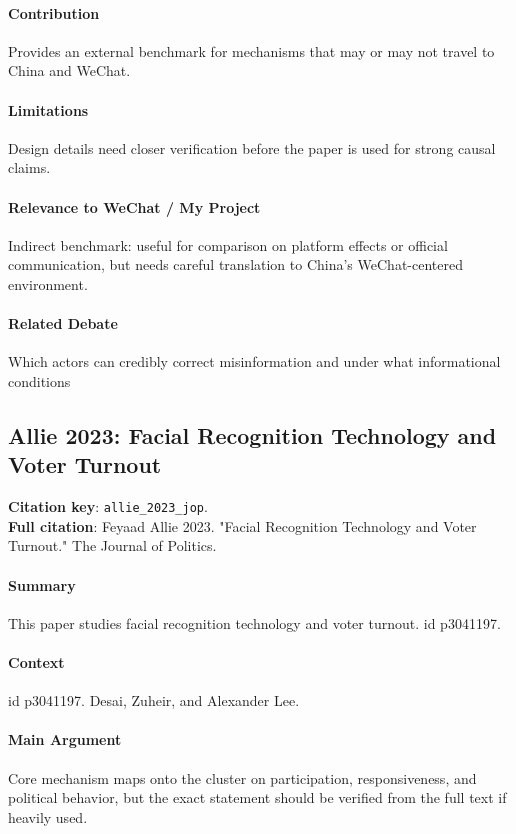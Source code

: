 \documentclass[12pt]{article}
\begin{document}
\paragraph{Contribution} Provides an external benchmark for mechanisms that may or may not travel to China and WeChat.

\paragraph{Limitations} Design details need closer verification before the paper is used for strong causal claims.

\paragraph{Relevance to WeChat / My Project} Indirect benchmark: useful for comparison on platform effects or official communication, but needs careful translation to China's WeChat-centered environment.

\paragraph{Related Debate} Which actors can credibly correct misinformation and under what informational conditions


\subsection{Allie 2023: Facial Recognition Technology and Voter Turnout}
\textbf{Citation key}: \texttt{allie\_2023\_jop}.\\
\textbf{Full citation}: Feyaad Allie 2023. "Facial Recognition Technology and Voter Turnout." The Journal of Politics.

\paragraph{Summary} This paper studies facial recognition technology and voter turnout. id p3041197.

\paragraph{Context} id p3041197. Desai, Zuheir, and Alexander Lee.

\paragraph{Main Argument} Core mechanism maps onto the cluster on participation, responsiveness, and political behavior, but the exact statement should be verified from the full text if heavily used.
\end{document}
